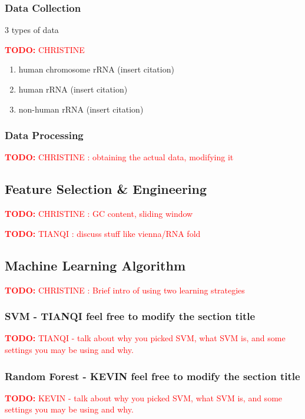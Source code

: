 \documentclass[paper=a4, fontsize=11pt]{scrartcl}
\numberwithin{equation}{section}    %
\numberwithin{figure}{section}      %
\numberwithin{table}{section}       %
\newcommand{\TODO}[1]{\textcolor{red}{\textbf{TODO: } #1}}
\numberwithin{equation}{section}    %
\numberwithin{figure}{section}      %
\numberwithin{table}{section}       %
\begin{document}
\subsubsection{Data Collection}

3 types of data

\TODO{CHRISTINE}

\begin{enumerate}
	\item human chromosome rRNA (insert citation)
	\item human rRNA (insert citation)
	\item non-human rRNA (insert citation)
\end{enumerate}

\subsubsection{Data Processing}

\TODO{CHRISTINE : obtaining the actual data, modifying it}

\subsection{Feature Selection \& Engineering}

\TODO{CHRISTINE :  GC content, sliding window}

\TODO{TIANQI : discuss stuff like vienna/RNA fold}

\subsection{Machine Learning Algorithm}

\TODO{CHRISTINE : Brief intro of using two learning strategies}

\subsubsection{SVM - TIANQI feel free to modify the section title}

\TODO{TIANQI - talk about why you picked SVM, what SVM is, and some settings you may be using and why.}

\subsubsection{Random Forest - KEVIN feel free to modify the section title}

\TODO{KEVIN - talk about why you picked SVM, what SVM is, and some settings you may be using and why.}
\end{document}
